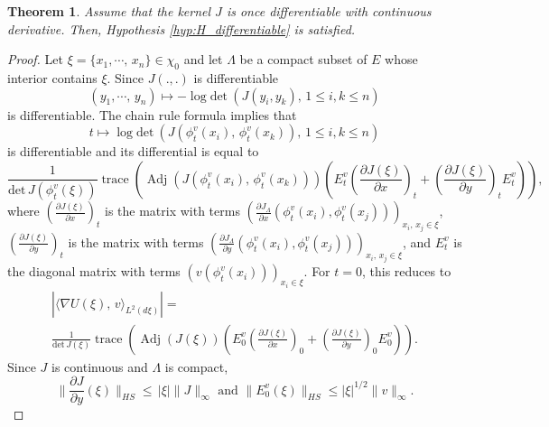 \documentclass[11pt,a4paper]{amsart}
\newtheorem{Theorem}{Theorem}
\begin{document}
\begin{Theorem}
  \label{thm:differentiability_J}
  Assume that the kernel $J$ is once differentiable with continuous
  derivative. Then, Hypothesis \ref{hyp:H_differentiable} is
  satisfied.
\end{Theorem}
\begin{proof}
  Let $\xi=\{x_1,\cdots,\, x_n\}\in \chi_0$ and let $\Lambda$ be a
  compact subset of $E$ whose interior contains $\xi$. Since $J(.,.)$
  is differentiable
  \begin{equation*}
    (y_1,\cdots,\, y_n)\longmapsto -\log{{\text{det}}}\ (J(y_i,y_k), \, 1\le
    i,k\le n)
  \end{equation*}
  is differentiable.  The chain rule formula implies that
  \begin{equation*}
    t\longmapsto \log{{\text{det}}}\ (J(\phi_t^v(x_i),\, \phi_t^v(x_k)), \, 1\le
    i,k\le n)
  \end{equation*}
  is differentiable and its differential is equal to
  \begin{equation*}
    \frac{1}{{{\text{det}}} \, J(\phi_t^v(\xi))}  {\operatorname{trace}}\left( {\operatorname{Adj}}  (J(\phi_t^v(x_i),\, \phi_t^v(x_k))) \left(E^v_{t}(\frac{\partial J(\xi)}{\partial x})_{t}+(\frac{\partial J(\xi)}{\partial y})_{t}E^v_{t}\right)\right),
  \end{equation*}
  where $(\frac{\partial J(\xi)}{\partial x})_{t}$ is the matrix with
  terms $\left(\frac{\partial J_{\Lambda}}{\partial
      x}(\phi^v_{t}(x_i),\phi^v_{t}(x_j))\right)_{x_i,\, x_j \in
    \xi}$, $(\frac{\partial J(\xi)}{\partial y})_{t}$ is the matrix
  with terms $\left(\frac{\partial J_{\Lambda}}{\partial
      y}(\phi^v_{t}(x_i),\phi^v_{t}(x_j))\right)_{x_i,\, x_j \in \xi
  }$, and $E^v_{t}$ is the diagonal matrix with terms
  $\left(v(\phi_{t}^v(x_i))\right)_{x_i \in \xi}$. For $t=0$, this
  reduces to
  \begin{multline*}
    \left| \langle \nabla U(\xi),\, v\rangle_{L^2(d\xi)}\right|=\\
    \frac{1}{{{\text{det}}} \, J(\xi)} {\operatorname{trace}}\left( {\operatorname{Adj}} (J(\xi))
      \left(E^v_{0}(\frac{\partial J(\xi)}{\partial
          x})_{0}+(\frac{\partial J(\xi)}{\partial
          y})_{0}E^v_{0}\right)\right).
  \end{multline*}
  Since $J$ is continuous and $\Lambda$ is compact,
  \begin{equation*}
    \| \frac{\partial J}{\partial y}(\xi)\|_{HS}\le \, |\xi|
    \|J\|_\infty \text{ and } \|E^v_0(\xi)\|_{HS}\le |\xi|^{1/2}\|v\|_\infty.

\end{equation*}
\end{proof}
\end{document}

